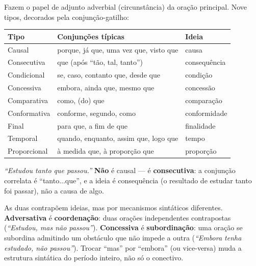 \begin{conceito}
Fazem o papel de adjunto adverbial (circunstância) da oração principal. Nove
tipos, decorados pela conjunção-gatilho:

\begin{center}
\begin{tabular}{@{}p{2.6cm}p{4.8cm}p{4.6cm}@{}}
\toprule
\textbf{Tipo} & \textbf{Conjunções típicas} & \textbf{Ideia} \\
\midrule
Causal & porque, já que, uma vez que, visto que & causa \\
Consecutiva & que (após “tão, tal, tanto”) & consequência \\
Condicional & se, caso, contanto que, desde que & condição \\
Concessiva & embora, ainda que, mesmo que & concessão \\
Comparativa & como, (do) que & comparação \\
Conformativa & conforme, segundo, como & conformidade \\
Final & para que, a fim de que & finalidade \\
Temporal & quando, enquanto, assim que, logo que & tempo \\
Proporcional & à medida que, à proporção que & proporção \\
\bottomrule
\end{tabular}
\end{center}
\end{conceito}

\begin{cuidado}
\textit{“Estudou tanto que passou.”} \textbf{Não} é causal --- é
\textbf{consecutiva}: a conjunção correlata é “tanto...que”, e a ideia é
consequência (o resultado de estudar tanto foi passar), não a causa de algo.
\end{cuidado}

\begin{cuidado}
As duas contrapõem ideias, mas por mecanismos sintáticos diferentes.
\textbf{Adversativa} é \textbf{coordenação}: duas orações independentes
contrapostas (\textit{“Estudou, mas não passou”}). \textbf{Concessiva} é
\textbf{subordinação}: uma oração se subordina admitindo um obstáculo que
não impede a outra (\textit{“Embora tenha estudado, não passou”}). Trocar
“mas” por “embora” (ou vice-versa) muda a estrutura sintática do período
inteiro, não só o conectivo.
\end{cuidado}


